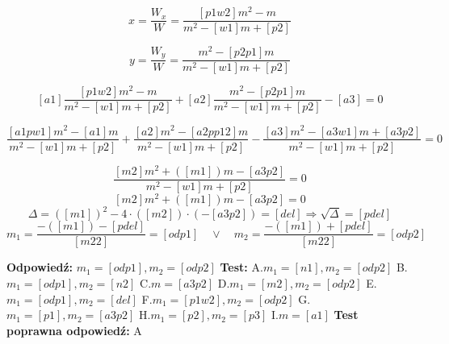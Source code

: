 \documentclass[12pt, a4paper]{article}
\theoremstyle{definition} %
\newcommand{\rozwStop}{\newline}                                            %
\newcommand{\odpStart}{\noindent \textbf{Odpowiedź:}\newline}    %
\newcommand{\odpStop}{\newline}                                             %
\newcommand{\testStart}{\noindent \textbf{Test:}\newline} %
\newcommand{\testStop}{\newline} %
\newcommand{\kluczStart}{\noindent \textbf{Test poprawna odpowiedź:}\newline} %
\newcommand{\kluczStop}{\newline} %
\begin{document}
$$x=\frac{W_{x}}{W}=\frac{[p1w2]m^{2}-m}{m^{2}-[w1]m+[p2]}$$

$$y=\frac{W_{y}}{W}=\frac{m^{2}-[p2p1]m}{m^{2}-[w1]m+[p2]}$$

$$[a1]\frac{[p1w2]m^{2}-m}{m^{2}-[w1]m+[p2]}+[a2]\frac{m^{2}-[p2p1]m}{m^{2}-[w1]m+[p2]}-[a3]=0$$

$$\frac{[a1pw1]m^{2}-[a1]m}{m^{2}-[w1]m+[p2]}+\frac{[a2]m^{2}-[a2pp12]m}{m^{2}-[w1]m+[p2]}-\frac{[a3]m^{2}-[a3w1]m+[a3p2]}{m^{2}-[w1]m+[p2]}=0$$

$$\frac{[m2]m^{2}+([m1])m-[a3p2]}{m^{2}-[w1]m+[p2]}=0$$
$$[m2]m^{2}+([m1])m-[a3p2]=0$$
$$\Delta=([m1])^{2}-4\cdot([m2])\cdot(-[a3p2])=[del] \Rightarrow \sqrt{\Delta}=[pdel]$$
$$m_{1}=\frac{-([m1])-[pdel]}{[m22]}=[odp1]\quad \lor \quad m_{2}=\frac{-([m1])+[pdel]}{[m22]}=[odp2]$$



\rozwStop
\odpStart
$m_{1}=[odp1], m_{2}=[odp2]$
\odpStop
\testStart
A.$m_{1}=[n1], m_{2}=[odp2]$
B.$m_{1}=[odp1], m_{2}=[n2]$
C.$m=[a3p2]$
D.$m_{1}=[m2], m_{2}=[odp2]$
E.$m_{1}=[odp1], m_{2}=[del]$
F.$m_{1}=[p1w2], m_{2}=[odp2]$
G.$m_{1}=[p1], m_{2}=[a3p2]$
H.$m_{1}=[p2], m_{2}=[p3]$
I.$m=[a1]$
\testStop
\kluczStart
A
\kluczStop
\end{document}
